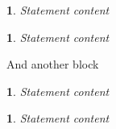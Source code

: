 
\newtheorem*{statement}{}

\begin{statement}
Statement content
\end{statement}

\newtheorem*{statement_}{}

\begin{statement_}
Statement content
\end{statement_}

And another block

\newtheorem*{statement__}{}

\begin{statement__}
Statement content
\end{statement__}

\newtheorem*{statement___}{}

\begin{statement___}
Statement content
\end{statement___}
